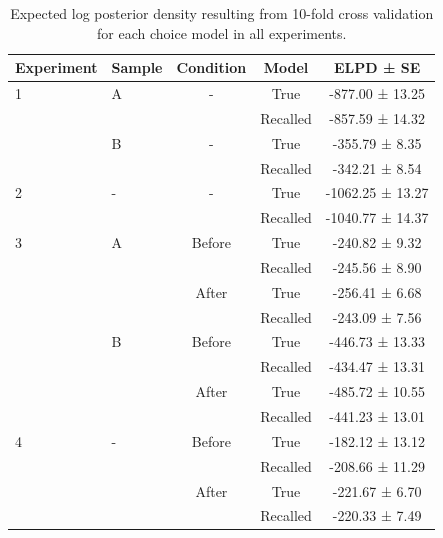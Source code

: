 \documentclass[10pt,letterpaper]{article}
\begin{document}
\clearpage
\begin{table}[h!]
\centering
\begin{tabular}{llccc}
\hline
Experiment & Sample & Condition & Model & ELPD ± SE \\
\hline
1 & A & - & True & -877.00 ± 13.25 \\
  &   &   & Recalled & -857.59 ± 14.32 \\
  & B & - & True & -355.79 ± 8.35 \\
  &   &   & Recalled & -342.21 ± 8.54 \\
2 & - & - & True & -1062.25 ± 13.27 \\
  &   &   & Recalled & -1040.77 ± 14.37 \\
\hline
3 & A & Before & True & -240.82 ± 9.32 \\
  &   &        & Recalled & -245.56 ± 8.90 \\
  &   & After & True & -256.41 ± 6.68 \\
  &   &       & Recalled & -243.09 ± 7.56 \\
  & B & Before & True & -446.73 ± 13.33 \\
  &   &        & Recalled & -434.47 ± 13.31 \\
  &   & After & True & -485.72 ± 10.55 \\
  &   &       & Recalled & -441.23 ± 13.01 \\
4 & - & Before & True & -182.12 ± 13.12 \\
  &   &        & Recalled & -208.66 ± 11.29 \\
  &   & After & True & -221.67 ± 6.70 \\
  &   &       & Recalled & -220.33 ± 7.49 \\
\hline
\end{tabular}
\caption{Expected log posterior density resulting from 10-fold cross validation for each choice model in all experiments.}
\label{tab:suppELPD}
\end{table}
\end{document}
